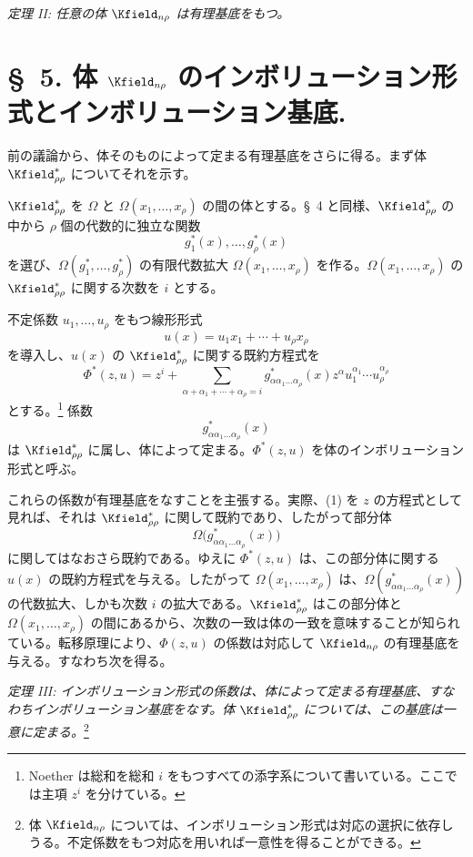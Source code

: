 \documentclass[11pt]{article}
\begin{document}
\emph{定理 II: 任意の体 $\Kfield_{n\rho}$ は有理基底をもつ。}

\section*{\S\ 5. 体 $\Kfield_{n\rho}$ のインボリューション形式とインボリューション基底.}

前の議論から、体そのものによって定まる有理基底をさらに得る。まず体 $\Kfield^*_{\rho\rho}$ についてそれを示す。

$\Kfield^*_{\rho\rho}$ を $\Omega$ と $\Omega(x_1,\ldots,x_\rho)$ の間の体とする。\S\ 4 と同様、$\Kfield^*_{\rho\rho}$ の中から $\rho$ 個の代数的に独立な関数
\[
  g_1^*(x),\ldots,g_\rho^*(x)
\]
を選び、$\Omega(g_1^*,\ldots,g_\rho^*)$ の有限代数拡大 $\Omega(x_1,\ldots,x_\rho)$ を作る。$\Omega(x_1,\ldots,x_\rho)$ の $\Kfield^*_{\rho\rho}$ に関する次数を $i$ とする。

不定係数 $u_1,\ldots,u_\rho$ をもつ線形形式
\[
  u(x)=u_1x_1+\cdots+u_\rho x_\rho
\]
を導入し、$u(x)$ の $\Kfield^*_{\rho\rho}$ に関する既約方程式を
\begin{equation}
 \Phi^*(z,u)=z^i+\sum_{\alpha+\alpha_1+\cdots+\alpha_\rho=i}
 g^*_{\alpha\alpha_1\ldots\alpha_\rho}(x)
 z^\alpha u_1^{\alpha_1}\cdots u_\rho^{\alpha_\rho}
\tag{1}
\end{equation}
とする。\footnote{Noether は総和を総和 $i$ をもつすべての添字系について書いている。ここでは主項 $z^i$ を分けている。} 係数
\[
  g^*_{\alpha\alpha_1\ldots\alpha_\rho}(x)
\]
は $\Kfield^*_{\rho\rho}$ に属し、体によって定まる。$\Phi^*(z,u)$ を体のインボリューション形式と呼ぶ。

これらの係数が有理基底をなすことを主張する。実際、(1) を $z$ の方程式として見れば、それは $\Kfield^*_{\rho\rho}$ に関して既約であり、したがって部分体
\[
  \Omega\bigl(g^*_{\alpha\alpha_1\ldots\alpha_\rho}(x)\bigr)
\]
に関してはなおさら既約である。ゆえに $\Phi^*(z,u)$ は、この部分体に関する $u(x)$ の既約方程式を与える。したがって $\Omega(x_1,\ldots,x_\rho)$ は、$\Omega(g^*_{\alpha\alpha_1\ldots\alpha_\rho}(x))$ の代数拡大、しかも次数 $i$ の拡大である。$\Kfield^*_{\rho\rho}$ はこの部分体と $\Omega(x_1,\ldots,x_\rho)$ の間にあるから、次数の一致は体の一致を意味することが知られている。転移原理により、$\Phi(z,u)$ の係数は対応して $\Kfield_{n\rho}$ の有理基底を与える。すなわち次を得る。

\emph{定理 III: インボリューション形式の係数は、体によって定まる有理基底、すなわちインボリューション基底をなす。体 $\Kfield^*_{\rho\rho}$ については、この基底は一意に定まる。}\footnote{体 $\Kfield_{n\rho}$ については、インボリューション形式は対応の選択に依存しうる。不定係数をもつ対応を用いれば一意性を得ることができる。}
\end{document}
